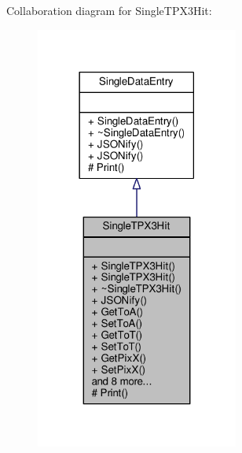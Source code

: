 Collaboration diagram for Single\+T\+P\+X3\+Hit\+:
\nopagebreak
\begin{figure}[H]
\begin{center}
\leavevmode
\includegraphics[width=189pt]{classSingleTPX3Hit__coll__graph}
\end{center}
\end{figure}

